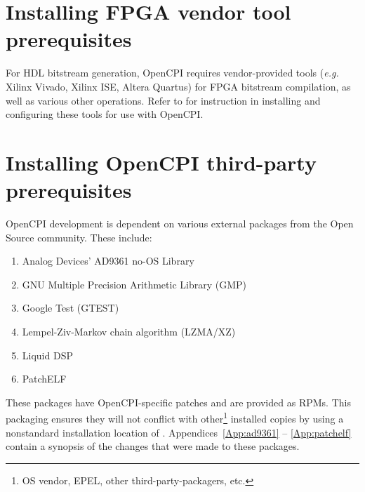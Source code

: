 \section{Installing FPGA vendor tool prerequisites}
\label{sec:installing_fpga_vendor_prereq}
For HDL bitstream generation, OpenCPI requires vendor-provided tools (\textit{e.g.} Xilinx Vivado, Xilinx ISE, Altera Quartus) for FPGA bitstream compilation, as well as various other operations. Refer to  for instruction in installing and configuring these tools for use with OpenCPI.

\section{Installing OpenCPI third-party prerequisites}
\label{sec:installing_prereq}

OpenCPI development is dependent on various external packages from the Open Source community. These include:
	\begin{enumerate}
		\item Analog Devices' AD9361 no-OS Library
		\item GNU Multiple Precision Arithmetic Library (GMP)
		\item Google Test (GTEST)
		\item Lempel-Ziv-Markov chain algorithm (LZMA/XZ)
		\item Liquid DSP
		\item PatchELF
	\end{enumerate}
These packages have OpenCPI-specific patches and are provided as RPMs. This packaging ensures they will not conflict with other\footnote{OS vendor, EPEL, other third-party-packagers, etc.} installed copies by using a nonstandard installation location of . Appendices~\ref{App:ad9361} -- \ref{App:patchelf} contain a synopsis of the changes that were made to these packages.\\

